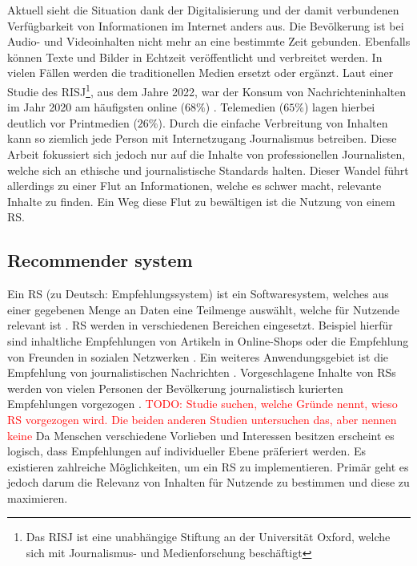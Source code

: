 Aktuell sieht die Situation dank der Digitalisierung und der damit verbundenen Verfügbarkeit von Informationen im Internet anders aus.
Die Bevölkerung ist bei Audio- und Videoinhalten nicht mehr an eine bestimmte Zeit gebunden.
Ebenfalls können Texte und Bilder in Echtzeit veröffentlicht und verbreitet werden.
In vielen Fällen werden die traditionellen Medien ersetzt oder ergänzt.
Laut einer Studie des \ac{RISJ}\footnote{Das \ac{RISJ} ist eine unabhängige Stiftung an der Universität Oxford, welche sich mit Journalismus- und Medienforschung beschäftigt}, aus dem Jahre 2022, war der Konsum von Nachrichteninhalten im Jahr 2020 am häufigsten online ($68\%$) \cite{reuters-2022}.
Telemedien ($65\%$) lagen hierbei deutlich vor Printmedien ($26\%$).
Durch die einfache Verbreitung von Inhalten kann so ziemlich jede Person mit Internetzugang Journalismus betreiben.
Diese Arbeit fokussiert sich jedoch nur auf die Inhalte von professionellen Journalisten, welche sich an ethische und journalistische Standards halten.
Dieser Wandel führt allerdings zu einer Flut an Informationen, welche es schwer macht, relevante Inhalte zu finden.
Ein Weg diese Flut zu bewältigen ist die Nutzung von einem \ac{RS}.

\subsection{Recommender system}
Ein \acf{RS} (zu Deutsch: Empfehlungssystem) ist ein Softwaresystem, welches aus einer gegebenen Menge an Daten eine Teilmenge auswählt, welche für Nutzende relevant ist \cite{recommender-systems}.
\ac{RS} werden in verschiedenen Bereichen eingesetzt.
Beispiel hierfür sind inhaltliche Empfehlungen von Artikeln in Online-Shops oder die Empfehlung von Freunden in sozialen Netzwerken \cite{ecommerce-recommender, social-recommender}.
Ein weiteres Anwendungsgebiet ist die Empfehlung von journalistischen Nachrichten \cite{news-recommender}.
Vorgeschlagene Inhalte von \acp{RS} werden von vielen Personen der Bevölkerung journalistisch kurierten Empfehlungen vorgezogen \cite{recommender-preference, theory-of-machine}.
\textcolor{red}{TODO: Studie suchen, welche Gründe nennt, wieso RS vorgezogen wird. Die beiden anderen Studien untersuchen das, aber nennen keine}
Da Menschen verschiedene Vorlieben und Interessen besitzen erscheint es logisch, dass Empfehlungen auf individueller Ebene präferiert werden.
Es existieren zahlreiche Möglichkeiten, um ein \ac{RS} zu implementieren.
Primär geht es jedoch darum die Relevanz von Inhalten für Nutzende zu bestimmen und diese zu maximieren. \\

